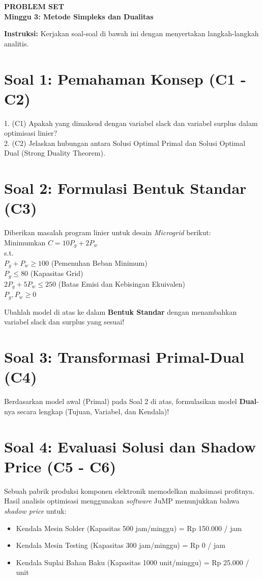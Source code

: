 \documentclass[11pt, a4paper]{article}
\begin{document}
\begin{center}
    \Large\color{UNIBBlue}\textbf{PROBLEM SET}\\
    \large\textbf{Minggu 3: Metode Simpleks dan Dualitas}
\end{center}

\vspace{0.5cm}

\textbf{Instruksi:} Kerjakan soal-soal di bawah ini dengan menyertakan langkah-langkah analitis.

\section*{Soal 1: Pemahaman Konsep (C1 - C2)}
1. (C1) Apakah yang dimaksud dengan variabel slack dan variabel surplus dalam optimisasi linier? \\
2. (C2) Jelaskan hubungan antara Solusi Optimal Primal dan Solusi Optimal Dual (Strong Duality Theorem).

\section*{Soal 2: Formulasi Bentuk Standar (C3)}
Diberikan masalah program linier untuk desain \textit{Microgrid} berikut: \\
Minimumkan $C = 10P_g + 2P_w$ \\
s.t. \\
$P_g + P_w \ge 100$ (Pemenuhan Beban Minimum) \\
$P_g \le 80$ (Kapasitas Grid) \\
$2P_g + 5P_w \le 250$ (Batas Emisi dan Kebisingan Ekuivalen) \\
$P_g, P_w \ge 0$

Ubahlah model di atas ke dalam \textbf{Bentuk Standar} dengan menambahkan variabel slack dan surplus yang sesuai!

\section*{Soal 3: Transformasi Primal-Dual (C4)}
Berdasarkan model awal (Primal) pada Soal 2 di atas, formulasikan model \textbf{Dual}-nya secara lengkap (Tujuan, Variabel, dan Kendala)!

\section*{Soal 4: Evaluasi Solusi dan Shadow Price (C5 - C6)}
Sebuah pabrik produksi komponen elektronik memodelkan maksimasi profitnya. Hasil analisis optimisasi menggunakan \textit{software} JuMP menunjukkan bahwa \textit{shadow price} untuk:
\begin{itemize}
    \item Kendala Mesin Solder (Kapasitas 500 jam/minggu) = Rp 150.000 / jam
    \item Kendala Mesin Testing (Kapasitas 300 jam/minggu) = Rp 0 / jam
    \item Kendala Suplai Bahan Baku (Kapasitas 1000 unit/minggu) = Rp 25.000 / unit
\end{itemize}
\end{document}
